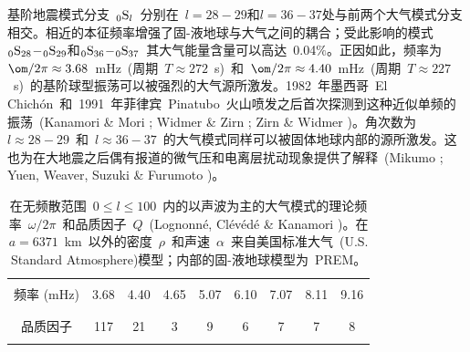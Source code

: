{基阶地震模式分支~${}_0{\rm S}_l$~分别在~$l=28\!-\!29$和$l=36\!-\!37$处与前两个大气模式分支相交。相近的本征频率增强了固-液地球与大气之间的耦合；受此影响的模式~${}_0{\rm S}_{28}\!-\!{}_0{\rm S}_{29}$和${}_0{\rm S}_{36}\!-\!{}_0{\rm S}_{37}$~其大气能量含量可以高达~0.04$\%$。正因如此，频率为~$\om/2\pi\approx 3.68$~mHz~(周期~$T\approx 272$~s)~和~$\om/2\pi\approx 4.40$~mHz~(周期~$T\approx 227$~s)~的基阶球型振荡可以被强烈的大气源所激发。1982~年墨西哥~El Chich\'{o}n~和~1991~年菲律宾~Pinatubo~火山喷发之后首次探测到这种近似单频的振荡~(Kanamori \& Mori \citeyear{kanamori&mori92}; Widmer \& Zirn \citeyear{widmer&zurn92b}; Zirn \& Widmer \citeyear{zurn&widmer96})。角次数为~$l\approx 28\!-\!29$~和~$l\approx36\!-\!37$~的大气模式同样可以被固体地球内部的源所激发。这也为在大地震之后偶有报道的微气压和电离层扰动现象提供了解释~(Mikumo \citeyear{mikumo68}; Yuen, Weaver, Suzuki \& Furumoto \citeyear{yuen&al69})。
\begin{table}[!t]
\centering
\begin{tabular}{|c|c|c|c|c|c|c|c|c|} \hline
& & & & & & & & \\
\hspace{-0.1 mm}频率 (mHz)\hspace{-0.1 mm}
& \hspace{-0.1 mm}3.68\hspace{-0.1 mm} &
\hspace{-0.1 mm}4.40\hspace{-0.1 mm} &
\hspace{-0.1 mm}4.65\hspace{-0.1 mm} &
\hspace{-0.1 mm}5.07\hspace{-0.1 mm} &
\hspace{-0.1 mm}6.10\hspace{-0.1 mm} &
\hspace{-0.1 mm}7.07\hspace{-0.1 mm} &
\hspace{-0.1 mm}8.11\hspace{-0.1 mm} &
\hspace{-0.1 mm}9.16\hspace{-0.1 mm} \\
& & & & & & & & \\ \hline
& & & & & & & & \\
品质因子 & 117 & 21 & 3 & 9 & 6 & 7 & 7 & 8 \\
& & & & & & & & \\ \hline
\end{tabular}
\caption[atm modes]{
在无频散范围~$0\leq l\leq 100$~内的以声波为主的大气模式的理论频率~$\omega/2\pi$~和品质因子~$Q$~(Lognonn\'{e}, Cl\'{e}v\'{e}d\'{e} \& Kanamori
\citeyear{lognonne&al98})。在$a=6371$~km~以外的密度~$\rho$~和声速~$\alpha$~来自美国标准大气~(U.S. Standard Atmosphere)模型；内部的固-液地球模型为~PREM。
}
\label{table:atmmodes}
\end{table}

}
